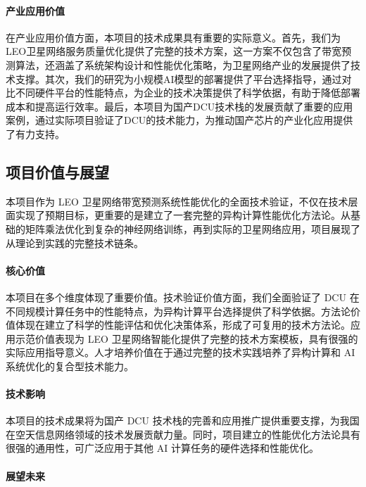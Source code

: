 \documentclass[a4paper]{article}
\begin{document}
\paragraph{产业应用价值}

在产业应用价值方面，本项目的技术成果具有重要的实际意义。首先，我们为LEO卫星网络服务质量优化提供了完整的技术方案，这一方案不仅包含了带宽预测算法，还涵盖了系统架构设计和性能优化策略，为卫星网络产业的发展提供了技术支撑。其次，我们的研究为小规模AI模型的部署提供了平台选择指导，通过对比不同硬件平台的性能特点，为企业的技术决策提供了科学依据，有助于降低部署成本和提高运行效率。最后，本项目为国产DCU技术栈的发展贡献了重要的应用案例，通过实际项目验证了DCU的技术能力，为推动国产芯片的产业化应用提供了有力支持。

\subsection{项目价值与展望}

本项目作为 LEO 卫星网络带宽预测系统性能优化的全面技术验证，不仅在技术层面实现了预期目标，更重要的是建立了一套完整的异构计算性能优化方法论。从基础的矩阵乘法优化到复杂的神经网络训练，再到实际的卫星网络应用，项目展现了从理论到实践的完整技术链条。

\paragraph{核心价值}

本项目在多个维度体现了重要价值。技术验证价值方面，我们全面验证了 DCU 在不同规模计算任务中的性能特点，为异构计算平台选择提供了科学依据。方法论价值体现在建立了科学的性能评估和优化决策体系，形成了可复用的技术方法论。应用示范价值表现为 LEO 卫星网络智能化提供了完整的技术方案模板，具有很强的实际应用指导意义。人才培养价值在于通过完整的技术实践培养了异构计算和 AI 系统优化的复合型技术能力。

\paragraph{技术影响}

本项目的技术成果将为国产 DCU 技术栈的完善和应用推广提供重要支撑，为我国在空天信息网络领域的技术发展贡献力量。同时，项目建立的性能优化方法论具有很强的通用性，可广泛应用于其他 AI 计算任务的硬件选择和性能优化。

\paragraph{展望未来}
\end{document}
